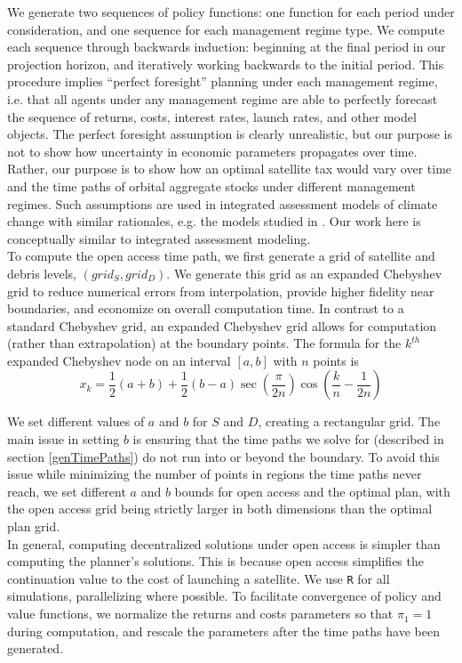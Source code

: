 \documentclass[12pt]{article}
\begin{document}
We generate two sequences of policy functions: one function for each period under consideration, and one sequence for each management regime type. We compute each sequence through backwards induction: beginning at the final period in our projection horizon, and iteratively working backwards to the initial period. This procedure implies ``perfect foresight'' planning under each management regime, i.e. that all agents under any management regime are able to perfectly forecast the sequence of returns, costs, interest rates, launch rates, and other model objects. The perfect foresight assumption is clearly unrealistic, but our purpose is not to show how uncertainty in economic parameters propagates over time. Rather, our purpose is to show how an optimal satellite tax would vary over time and the time paths of orbital aggregate stocks under different management regimes. Such assumptions are used in integrated assessment models of climate change with similar rationales, e.g. the models studied in \citet{kellykolstad1999, nordhaus2013, IAMsummary}. Our work here is conceptually similar to integrated assessment modeling. \\

To compute the open access time path, we first generate a grid of satellite and debris levels, $(grid_S,grid_D)$. We generate this grid as an expanded Chebyshev grid to reduce numerical errors from interpolation, provide higher fidelity near boundaries, and economize on overall computation time. In contrast to a standard Chebyshev grid, an expanded Chebyshev grid allows for computation (rather than extrapolation) at the boundary points. The formula for the $k^{th}$ expanded Chebyshev node on an interval $[a,b]$ with $n$ points is
\[ x_k = \frac{1}{2}(a+b) + \frac{1}{2}(b-a)\sec\left( \frac{\pi}{2n} \right) \cos\left( \frac{k}{n} - \frac{1}{2n} \right) \]

We set different values of $a$ and $b$ for $S$ and $D$, creating a rectangular grid. The main issue in setting $b$ is ensuring that the time paths we solve for (described in section \ref{genTimePaths}) do not run into or beyond the boundary. To avoid this issue while minimizing the number of points in regions the time paths never reach, we set different $a$ and $b$ bounds for open access and the optimal plan, with the open access grid being strictly larger in both dimensions than the optimal plan grid. \\ 

In general, computing decentralized solutions under open access is simpler than computing the planner's solutions. This is because open access simplifies the continuation value to the cost of launching a satellite. We use \texttt{R} for all simulations, parallelizing where possible. To facilitate convergence of policy and value functions, we normalize the returns and costs parameters so that $\pi_1 = 1$ during computation, and rescale the parameters after the time paths have been generated. \\
\end{document}
